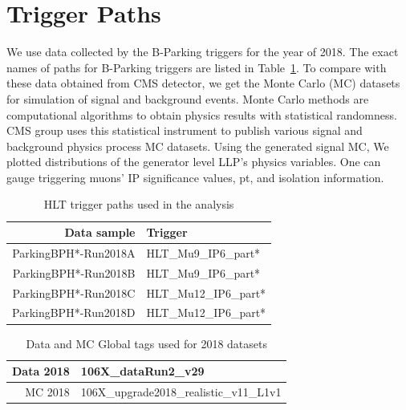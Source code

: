 \section{Trigger Paths}
We use data collected by the B-Parking triggers for the year of 2018.
The exact names of paths for B-Parking triggers are listed in Table~\ref{tab:triggers18}.
To compare with these data obtained from CMS detector, we get the Monte Carlo (MC) datasets for simulation of signal and background events.
Monte Carlo methods are computational algorithms to obtain physics results with statistical randomness.
CMS group uses this statistical instrument to publish various signal and background physics process MC datasets.
Using the generated signal MC, We plotted distributions of the generator level LLP's physics variables.
One can gauge triggering muons' IP significance values, pt, and isolation information.
\begin{table}[htb]
\caption{HLT trigger paths used in the analysis}
\begin{center}
\begin{tabular}{r|l}\hline
\hline
 Data sample & Trigger \\
\hline
 ParkingBPH*-Run2018A & HLT\_Mu9\_IP6\_part* \\
 ParkingBPH*-Run2018B & HLT\_Mu9\_IP6\_part* \\
 \hline
 ParkingBPH*-Run2018C & HLT\_Mu12\_IP6\_part* \\
 ParkingBPH*-Run2018D & HLT\_Mu12\_IP6\_part* \\
 \hline
 \hline
\end{tabular}
\label{tab:triggers18}
\end{center}
\end{table}

\begin{table}[htb]
\caption{Data and MC Global tags used for 2018 datasets}
\begin{center}
\begin{tabular}{r|l}\hline
 Data 2018 & 106X\_dataRun2\_v29 \\
 \hline
 MC 2018   & 106X\_upgrade2018\_realistic\_v11\_L1v1 \\
 \hline
\end{tabular}
\label{tab:GT}
\end{center}
\end{table}



